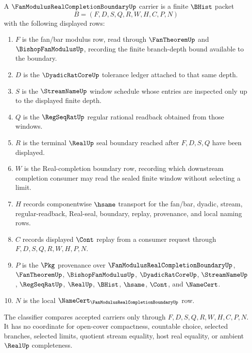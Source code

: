 \begin{definition}
\label{def:fan-modulus-real-completion-boundary-carrier}
A $\FanModulusRealCompletionBoundaryUp$ carrier is a finite $\BHist$ packet
$$
B=(F,D,S,Q,R,W,H,C,P,N)
$$
with the following displayed rows:
\begin{enumerate}
\item $F$ is the fan/bar modulus row, read through $\FanTheoremUp$ and $\BishopFanModulusUp$, recording the finite branch-depth bound available to the boundary.
\item $D$ is the $\DyadicRatCoreUp$ tolerance ledger attached to that same depth.
\item $S$ is the $\StreamNameUp$ window schedule whose entries are inspected only up to the displayed finite depth.
\item $Q$ is the $\RegSeqRatUp$ regular rational readback obtained from those windows.
\item $R$ is the terminal $\RealUp$ seal boundary reached after $F,D,S,Q$ have been displayed.
\item $W$ is the Real-completion boundary row, recording which downstream completion consumer may read the sealed finite window without selecting a limit.
\item $H$ records componentwise $\hsame$ transport for the fan/bar, dyadic, stream, regular-readback, Real-seal, boundary, replay, provenance, and local naming rows.
\item $C$ records displayed $\Cont$ replay from a consumer request through $F,D,S,Q,R,W,H,P,N$.
\item $P$ is the $\Pkg$ provenance over $\FanModulusRealCompletionBoundaryUp$, $\FanTheoremUp$, $\BishopFanModulusUp$, $\DyadicRatCoreUp$, $\StreamNameUp$, $\RegSeqRatUp$, $\RealUp$, $\BHist$, $\hsame$, $\Cont$, and $\NameCert$.
\item $N$ is the local $\NameCert_{\FanModulusRealCompletionBoundaryUp}$ row.
\end{enumerate}
The classifier compares accepted carriers only through $F,D,S,Q,R,W,H,C,P,N$. It has no coordinate for open-cover compactness, countable choice, selected branches, selected limits, quotient stream equality, host real equality, or ambient $\RealUp$ completeness.
\end{definition}

